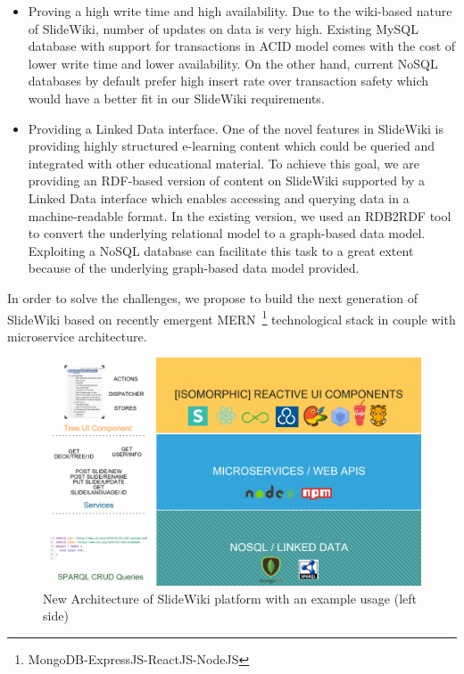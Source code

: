 \documentclass[ngerman,UKenglish,table]{scrbook}
\begin{document}
\begin{itemize}
\item{Proving a high write time and high availability.}
Due to the wiki-based nature of SlideWiki, number of updates on data is very high.
Existing MySQL database with support for transactions in ACID model comes with the cost of lower write time and lower availability.
On the other hand, current NoSQL databases by default prefer high insert rate over transaction safety which would have a better fit in our SlideWiki requirements.

\item{Providing a Linked Data interface.}
One of the novel features in SlideWiki is providing highly structured e-learning content which could be queried and integrated with other educational material.
To achieve this goal, we are providing an RDF-based version of content on SlideWiki supported by a Linked Data interface which enables accessing and querying  data in a machine-readable format.
In the existing version, we used an RDB2RDF tool to convert the underlying relational model to a graph-based data model.
Exploiting a NoSQL database can facilitate this task to a great extent because of the underlying graph-based data model provided.
\end{itemize}

In order to solve the challenges, we propose to build the next generation of SlideWiki based on recently emergent MERN~\footnote{MongoDB-ExpressJS-ReactJS-NodeJS} technological stack in couple with microservice architecture.

\begin{figure}[!ht]
\centering
\includegraphics[width=1\textwidth]{Images/slidewiki2_architecture.png}
\caption{New Architecture of SlideWiki platform with an example usage (left side)}
\label{fig:slidewiki2_architecture}
\end{figure}
\end{document}
